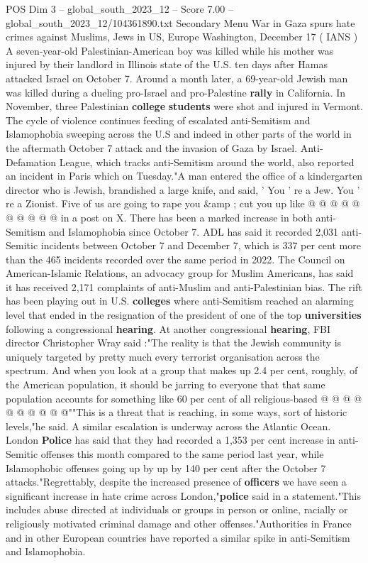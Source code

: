 \begin{textsample}{POS Dim 3 – global\_south\_2023\_12 – Score 7.00 – global\_south\_2023\_12/104361890.txt}  \label{ex:f3_pos_423}
Secondary Menu War in Gaza spurs hate crimes against Muslims, Jews in US, Europe Washington, December 17 ( IANS ) A seven-year-old Palestinian-American boy was killed while his mother was injured by their landlord in Illinois state of the U.S. ten days after Hamas attacked Israel on October 7.
Around a month later, a 69-year-old Jewish man was killed during a dueling pro-Israel and pro-Palestine \textbf{rally} in California.
In November, three Palestinian \textbf{college} \textbf{students} were shot and injured in Vermont.
The cycle of violence continues feeding of escalated anti-Semitism and Islamophobia sweeping across the U.S and indeed in other parts of the world in the aftermath October 7 attack and the invasion of Gaza by Israel.
Anti-Defamation League, which tracks anti-Semitism around the world, also reported an incident in Paris which on Tuesday."A man entered the office of a kindergarten director who is Jewish, brandished a large knife, and said, ' You ' re a Jew.
You ' re a Zionist.
Five of us are going to rape you \&amp ; cut you up like @ @ @ @ @ @ @ @ @ @ in a post on X.
There has been a marked increase in both anti-Semitism and Islamophobia since October 7.
ADL has said it recorded 2,031 anti-Semitic incidents between October 7 and December 7, which is 337 per cent more than the 465 incidents recorded over the same period in 2022.
The Council on American-Islamic Relations, an advocacy group for Muslim Americans, has said it has received 2,171 complaints of anti-Muslim and anti-Palestinian bias.
The rift has been playing out in U.S. \textbf{colleges} where anti-Semitism reached an alarming level that ended in the resignation of the president of one of the top \textbf{universities} following a congressional \textbf{hearing}.
At another congressional \textbf{hearing}, FBI director Christopher Wray said :"The reality is that the Jewish community is uniquely targeted by pretty much every terrorist organisation across the spectrum.
And when you look at a group that makes up 2.4 per cent, roughly, of the American population, it should be jarring to everyone that that same population accounts for something like 60 per cent of all religious-based @ @ @ @ @ @ @ @ @ @""This is a threat that is reaching, in some ways, sort of historic levels,"he said.
A similar escalation is underway across the Atlantic Ocean.
London \textbf{Police} has said that they had recorded a 1,353 per cent increase in anti-Semitic offenses this month compared to the same period last year, while Islamophobic offenses going up by up by 140 per cent after the October 7 attacks."Regrettably, despite the increased presence of \textbf{officers} we have seen a significant increase in hate crime across London,"\textbf{police} said in a statement."This includes abuse directed at individuals or groups in person or online, racially or religiously motivated criminal damage and other offenses."Authorities in France and in other European countries have reported a similar spike in anti-Semitism and Islamophobia.

\end{textsample}
